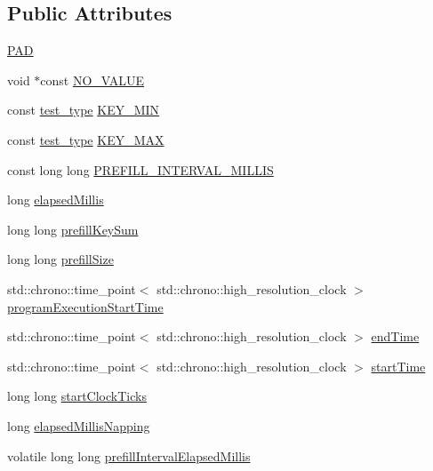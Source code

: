 \subsection*{Public Attributes}
\begin{DoxyCompactItemize}
\item 
\hyperlink{structglobals__t_a5452bbdfd5d85691f8f0d5b5ed091b9f}{P\+AD}
\item 
void $\ast$const \hyperlink{structglobals__t_a90159d9a317687abab232e1fda728f1a}{N\+O\+\_\+\+V\+A\+L\+UE}
\item 
const \hyperlink{microbench_2main_8cpp_a8c96a4eb128cbef9f7b7aa2f7533202f}{test\+\_\+type} \hyperlink{structglobals__t_a6025a17c21db364b4d05b63db453e7c7}{K\+E\+Y\+\_\+\+M\+IN}
\item 
const \hyperlink{microbench_2main_8cpp_a8c96a4eb128cbef9f7b7aa2f7533202f}{test\+\_\+type} \hyperlink{structglobals__t_ad8295a990809a58e6923bed1538ccb07}{K\+E\+Y\+\_\+\+M\+AX}
\item 
const long long \hyperlink{structglobals__t_a8916405ce0fc26eb6dfc3afa1e5ed249}{P\+R\+E\+F\+I\+L\+L\+\_\+\+I\+N\+T\+E\+R\+V\+A\+L\+\_\+\+M\+I\+L\+L\+IS}
\item 
long \hyperlink{structglobals__t_aa9724d3aea293ee3211f08cb1aa3d34e}{elapsed\+Millis}
\item 
long long \hyperlink{structglobals__t_a16f3cc1c4f5866cf4bf88758eb08c6e1}{prefill\+Key\+Sum}
\item 
long long \hyperlink{structglobals__t_a856f41e115dc0592310c05f149fb1a9f}{prefill\+Size}
\item 
std\+::chrono\+::time\+\_\+point$<$ std\+::chrono\+::high\+\_\+resolution\+\_\+clock $>$ \hyperlink{structglobals__t_a28d2a4525bd82f81cbca8236c3ba1ec7}{program\+Execution\+Start\+Time}
\item 
std\+::chrono\+::time\+\_\+point$<$ std\+::chrono\+::high\+\_\+resolution\+\_\+clock $>$ \hyperlink{structglobals__t_a4e6d795a5fd1a12435a22b57264cee82}{end\+Time}
\item 
std\+::chrono\+::time\+\_\+point$<$ std\+::chrono\+::high\+\_\+resolution\+\_\+clock $>$ \hyperlink{structglobals__t_a3585908ff51ae63a70f0db1fccb520ae}{start\+Time}
\item 
long long \hyperlink{structglobals__t_a2b5c5db84f6abc24cdc5d752984be6eb}{start\+Clock\+Ticks}
\item 
long \hyperlink{structglobals__t_a8c6edcc8b8cfd88acd7ad869f8ac446b}{elapsed\+Millis\+Napping}
\item 
volatile long long \hyperlink{structglobals__t_a9fe50e0b2d9933d00c4ad9a2212581fa}{prefill\+Interval\+Elapsed\+Millis}

\end{DoxyCompactItemize}
